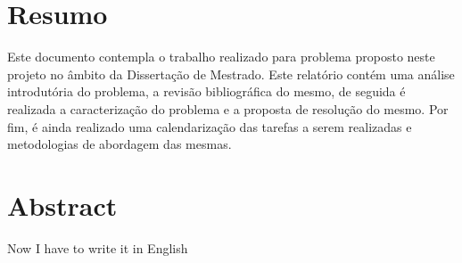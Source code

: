 \chapter*{Resumo}

Este documento contempla o trabalho realizado para problema proposto neste projeto no âmbito da Dissertação de Mestrado. Este relatório contém uma análise introdutória do problema, a revisão bibliográfica do mesmo, de seguida é realizada a caracterização do problema e a proposta de resolução do mesmo. Por fim, é ainda realizado uma calendarização das tarefas a serem realizadas e metodologias de abordagem das mesmas.

\chapter*{Abstract}

Now I have to write it in English
